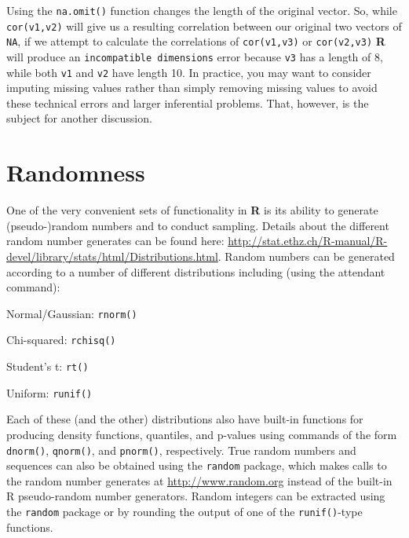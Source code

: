 \documentclass[12pt]{article}\usepackage[]{graphicx}\usepackage[]{color}
\begin{document}
Using the \verb|na.omit()| function changes the length of the original vector. So, while \verb|cor(v1,v2)| will give us a resulting correlation between our original two vectors of \verb|NA|, if we attempt to calculate the correlations of \verb|cor(v1,v3)| or \verb|cor(v2,v3)| \textbf{R} will produce an \verb|incompatible dimensions| error because \verb|v3| has a length of 8, while both \verb|v1| and \verb|v2| have length 10. In practice, you may want to consider imputing missing values rather than simply removing missing values to avoid these technical errors and larger inferential problems. That, however, is the subject for another discussion.

\section{Randomness}\label{sec:random}

One of the very convenient sets of functionality in \textbf{R} is its ability to generate (pseudo-)random numbers and to conduct sampling. Details about the different random number generates can be found here: \url{http://stat.ethz.ch/R-manual/R-devel/library/stats/html/Distributions.html}. Random numbers can be generated according to a number of different distributions including (using the attendant command):
\begin{itemize*}
\item Normal/Gaussian: \verb|rnorm()|
\item Chi-squared: \verb|rchisq()|
\item Student's t: \verb|rt()|
\item Uniform: \verb|runif()|
\end{itemize*}

Each of these (and the other) distributions also have built-in functions for producing density functions, quantiles, and p-values using commands of the form \verb|dnorm()|, \verb|qnorm()|, and \verb|pnorm()|, respectively. True random numbers and sequences can also be obtained using the \verb|random| package, which makes calls to the random number generates at \url{http://www.random.org} instead of the built-in R pseudo-random number generators. Random integers can be extracted using the \verb|random| package or by rounding the output of one of the \verb|runif()|-type functions.
\end{document}
